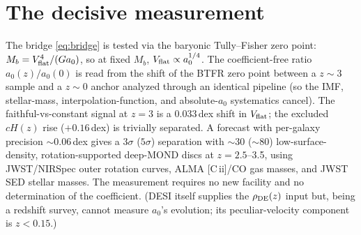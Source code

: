 \documentclass[11pt]{article}
\newcommand{\az}{a_0}
\newcommand{\rde}{\rho_{\rm DE}}
\begin{document}
\section{The decisive measurement}
\label{sec:test}
The bridge \eqref{eq:bridge} is tested via the baryonic Tully--Fisher zero point: $M_b=V_{\rm flat}^4/(G\az)$, so at
fixed $M_b$, $V_{\rm flat}\propto\az^{1/4}$. The coefficient-free ratio $\az(z)/\az(0)$ is read from the shift of
the BTFR zero point between a $z\sim3$ sample and a $z\sim0$ anchor analyzed through an identical pipeline (so the
IMF, stellar-mass, interpolation-function, and absolute-$\az$ systematics cancel). The faithful-vs-constant signal
at $z=3$ is a $0.033$\,dex shift in $V_{\rm flat}$; the excluded $cH(z)$ rise ($+0.16$\,dex) is trivially separated.
A forecast with per-galaxy precision $\sim$0.06\,dex gives a $3\sigma$ ($5\sigma$) separation with
$\sim$30 ($\sim$80) low-surface-density, rotation-supported deep-MOND discs at $z=2.5$--3.5, using JWST/NIRSpec
outer rotation curves, ALMA [C\,{\sc ii}]/CO gas masses, and JWST SED stellar masses. The measurement requires no
new facility and no determination of the coefficient. (DESI itself supplies the $\rde(z)$ input but, being a
redshift survey, cannot measure $\az$'s evolution; its peculiar-velocity component is $z<0.15$.)
\end{document}
